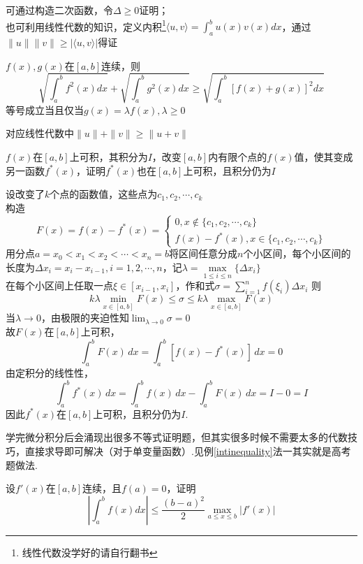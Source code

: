 \begin{analysis}
可通过构造二次函数，令$\Delta\geq0$证明；\\
也可利用线性代数的知识，定义内积\footnote{线性代数没学好的请自行翻书}$\displaystyle	\langle u,v\rangle=\int_a^bu(x)v(x)dx$，通过$\|u\|\|v\|\geq|\langle u,v\rangle|$得证
\end{analysis}
\begin{theorem}
$f(x),g(x)$在$[a,b]$连续，则
\[\sqrt{\int_a^bf^2(x)dx} + \sqrt{\int_a^bg^2(x)dx}\geq\sqrt{\int_a^b[f(x)+g(x)]^2dx}\]
等号成立当且仅当$g(x)=\lambda f(x),\lambda\geq 0$
\end{theorem}
\begin{analysis}
对应线性代数中$\|u\|+\|v\|\geq\|u+v\|$
\end{analysis}
\begin{example}
$f(x)$在$[a,b]$上可积，其积分为$I$，改变$[a,b]$内有限个点的$f(x)$值，使其变成另一函数$f^*(x)$，证明$f^*(x)$也在$[a,b]$上可积，且积分仍为$I$
\end{example}
\begin{analysis}
设改变了$k$个点的函数值，这些点为$c_1,c_2,\cdots,c_k$\\
构造
\[F(x)=f(x)-f^*(x)=\begin{cases}
0,x\notin\{c_1,c_2,\cdots,c_k\}\\
f(x)-f^*(x),x\in\{c_1,c_2,\cdots,c_k\}
\end{cases}\]
用分点$a=x_0<x_1<x_2<\cdots<x_n=b$将区间任意分成$n$个小区间，每个小区间的长度为$\Delta x_i=x_i-x_{i-1},i=1,2,\cdots,n$，记$\lambda = \underset{1\leq i\leq n}{\max}\{\Delta x_i\}$\\
在每个小区间上任取一点$\xi\in[x_{i-1},x_i]$，作和式$\displaystyle\sigma = \sum_{i=1}^{n}f(\xi_i)\Delta x_i$
则
\[k\lambda\underset{x\in[a,b]}{\min}F(x)\leq\sigma\leq k\lambda\underset{x\in[a,b]}{\max}F(x)\]
当$\lambda\to 0$，由极限的夹迫性知$\displaystyle\lim_{\lambda\to 0}\sigma=0$\\
故$F(x)$在$[a,b]$上可积，
\[\int_a^b F(x)\,dx=\int_a^b[f(x)-f^*(x)]\,dx=0\]
由定积分的线性性，
\[\int_a^b f^*(x)\,dx=\int_a^b f(x)\,dx-\int_a^b F(x)\,dx=I-0=I\]
因此$f^*(x)$在$[a,b]$上可积，且积分仍为$I$.
\end{analysis}
\par 学完微分积分后会涌现出很多不等式证明题，但其实很多时候不需要太多的代数技巧，直接求导即可解决（对于单变量函数）.见例\ref{intinequality}法一其实就是高考题做法.
\begin{example}
\label{intinequality}
设$f'(x)$在$[a,b]$连续，且$f(a)=0$，证明
\[\left|\int_a^bf(x)dx\right|\leq\frac{(b-a)^2}{2}\underset{a\leq x\leq b}{\max}|f'(x)|\]
\end{example}

